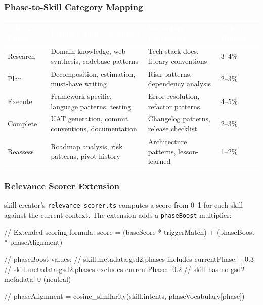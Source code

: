 \documentclass[11pt,letterpaper]{article}
\newcommand{\tableheader}[1]{\textbf{\sffamily\textcolor{white}{#1}}}
\begin{document}
\subsubsection{Phase-to-Skill Category Mapping}

\begin{center}
\begin{tabularx}{\textwidth}{L{2.5cm}L{4cm}L{4cm}X}
\toprule
{}
\tableheader{GSD-2 Phase} & \tableheader{Primary Skill Categories} & \tableheader{Secondary Categories} & \tableheader{Token Budget} \\
\midrule
Research & Domain knowledge, web synthesis, codebase patterns & Tech stack docs, library conventions & 3--4\% \\
Plan & Decomposition, estimation, must-have writing & Risk patterns, dependency analysis & 2--3\% \\
Execute & Framework-specific, language patterns, testing & Error resolution, refactor patterns & 4--5\% \\
Complete & UAT generation, commit conventions, documentation & Changelog patterns, release checklist & 2--3\% \\
Reassess & Roadmap analysis, risk patterns, pivot history & Architecture patterns, lesson-learned & 1--2\% \\
\bottomrule
\end{tabularx}
\end{center}

\subsubsection{Relevance Scorer Extension}

skill-creator's \texttt{relevance-scorer.ts} computes a score from 0--1 for each skill against the current context. The extension adds a \texttt{phaseBoost} multiplier:

\begin{asciibox}
// Extended scoring formula:
score = (baseScore * triggerMatch) + (phaseBoost * phaseAlignment)

// phaseBoost values:
//   skill.metadata.gsd2.phases includes currentPhase: +0.3
//   skill.metadata.gsd2.phases excludes currentPhase: -0.2
//   skill has no gsd2 metadata:                        0 (neutral)

// phaseAlignment = cosine_similarity(skill.intents, phaseVocabulary[phase])
\end{asciibox}
\end{document}
